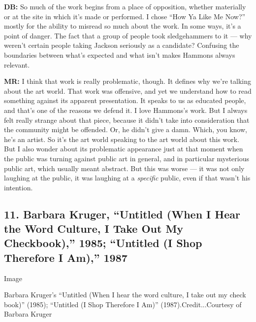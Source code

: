 \textbf{DB:} So much of the work begins from a place of opposition,
whether materially or at the site in which it's made or performed. I
chose ``How Ya Like Me Now?'' mostly for the ability to misread so much
about the work. In some ways, it's a point of danger. The fact that a
group of people took sledgehammers to it --- why weren't certain people
taking Jackson seriously as a candidate? Confusing the boundaries
between what's expected and what isn't makes Hammons always relevant.

\textbf{MR:} I think that work is really problematic, though. It defines
why we're talking about the art world. That work was offensive, and yet
we understand how to read something against its apparent presentation.
It speaks to us as educated people, and that's one of the reasons we
defend it. I love Hammons's work. But I always felt really strange about
that piece, because it didn't take into consideration that the community
might be offended. Or, he didn't give a damn. Which, you know, he's an
artist. So it's the art world speaking to the art world about this work.
But I also wonder about its problematic appearance just at that moment
when the public was turning against public art in general, and in
particular mysterious public art, which usually meant abstract. But this
was worse --- it was not only laughing at the public, it was laughing at
a \emph{specific} public, even if that wasn't his intention.

\hypertarget{11-barbara-kruger-untitled-when-i-hear-the-word-culture-i-take-out-my-checkbook-1985-untitled-i-shop-therefore-i-am-1987}{%
\subsection{11. Barbara Kruger, ``Untitled (When I Hear the Word
Culture, I Take Out My Checkbook),'' 1985; ``Untitled (I Shop Therefore
I Am),''
1987}\label{11-barbara-kruger-untitled-when-i-hear-the-word-culture-i-take-out-my-checkbook-1985-untitled-i-shop-therefore-i-am-1987}}

Image

Barbara Kruger's ``Untitled (When I hear the word culture, I take out my
check book)'' (1985); ``Untitled (I Shop Therefore I Am)''
(1987).Credit...Courtesy of Barbara Kruger

